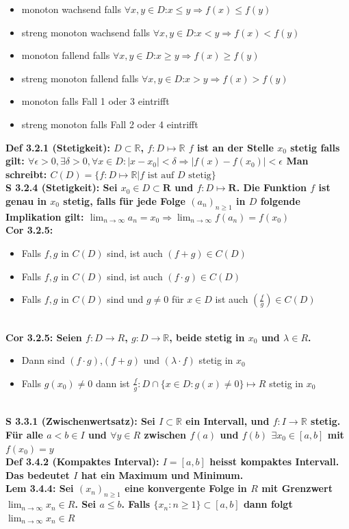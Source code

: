 \documentclass[7pt,landscape, margin = 0.1mm]{article}
\newcommand{\DEF}[2]{\color{chaptercolor}\bf{Def #1}:\color{black}    \hspace{0.2cm} #2 \\}
\newcommand{\COR}[2]{\color{chaptercolor}\bf{Cor #1}:\color{black}    \hspace{0.2cm} #2 \\}
\newcommand{\LEM}[2]{\color{chaptercolor}\bf{Lem #1}:\color{black}    \hspace{0.2cm} #2 \\}
\newcommand{\SA}[2]{\color{chaptercolor}\bf{S #1}:\color{black}    \hspace{0.2cm} #2 \\}
\begin{document}
\begin{multicols}{4}
\begin{flushleft}
{\begin{itemize}
\item[1.] monoton wachsend falls $\forall x,y \in D$:$ x \leq y \Rightarrow f(x) \leq f(y) $   
\item[2.] streng monoton wachsend falls $\forall x,y \in D$:$ x < y \Rightarrow f(x) < f(y) $
\item[3.] monoton fallend falls $\forall x,y \in D$:$ x \geq y \Rightarrow f(x) \geq f(y) $
\item[4.] streng monoton fallend falls $\forall x,y \in D$:$ x > y \Rightarrow f(x) > f(y) $
\item[5.] monoton falls Fall 1 oder 3 eintrifft
\item[6.] streng monoton falls Fall 2 oder 4 eintrifft  
\end{itemize}
}
\DEF{3.2.1 (Stetigkeit)}{$D \subset \mathbb{R}$, $f: D \mapsto \mathbb{R}$
$f$ ist an der Stelle $x_0$ stetig falls gilt:
$ \forall \epsilon > 0, \exists \delta > 0, \forall x \in D: |x-x_0| < \delta \Rightarrow|f(x)-f(x_0)|< \epsilon $ Man schreibt:
$C(D) = \{f: D\mapsto \mathbb{R} | f \text{ ist auf } D \text{ stetig} \}$}
\SA{3.2.4 (Stetigkeit)}{ Sei $x_0 \in D \subset \mathbf{R}$ und $f:D\mapsto \mathbf{R}$. Die Funktion $f$ ist genau in $x_0$ stetig, falls für jede Folge $(a_n)_{n \geq 1}$ in $D$ folgende Implikation gilt: $\lim_{n \to \infty} a_n = x_0 \Rightarrow \lim_{n \to \infty} f(a_n) = f(x_0)$}
\COR{3.2.5}{\begin{itemize}
\item[1.] Falls $f,g$ in $C(D)$ sind, ist auch $(f+g) \in C(D)$
   
\item[2.] Falls $f,g$ in $C(D)$ sind, ist auch $(f\cdot g) \in C(D)$
     
\item[3.] Falls $f,g$ in $C(D)$ sind und $g \neq 0$ für $x \in D$ ist auch $(\frac{f}{g}) \in C (D)$ \end{itemize} 
}

\COR{3.2.5}{Seien $f: D \to R$, 
$g:D\to \mathbb{R}$, beide stetig in $x_0$ und $\lambda \in R$.\begin{itemize}
\item[1.]Dann sind $(f \cdot g)$,$(f + g)$ und $(\lambda \cdot f)$ stetig in $x_0$ 
\item[2.] Falls $g(x_0) \neq 0$ dann ist $\frac{f}{g}:D \cap \{x \in D: g(x)\neq 0 \} \mapsto R$ stetig in $x_0$
\end{itemize}}

\SA{3.3.1 (Zwischenwertsatz)}{Sei $I \subset \mathbb{R}$ ein Intervall, und $f: I \to \mathbb{R}$ stetig.
Für alle $a < b \in I$ und $\forall y \in R$ zwischen $f(a)$ und $f(b)$ $\exists x_0 \in [a,b]$ mit $f(x_0) =y$}
\DEF{3.4.2 (Kompaktes Interval)}{$I = [a,b]$ heisst kompaktes Intervall. Das bedeutet $I$ hat ein Maximum und Minimum.}
\LEM{3.4.4}{Sei $(x_n)_{n \geq 1}$ eine konvergente Folge in $R$ mit Grenzwert $\lim_{n \to \infty} x_n \in R$. Sei $a\leq b$. Falls $\{x_n : n \geq 1 \}\subset  [a,b]$ dann folgt $\lim_{n \to \infty} x_n \in R$}


\end{flushleft}
\end{multicols}
\end{document}
